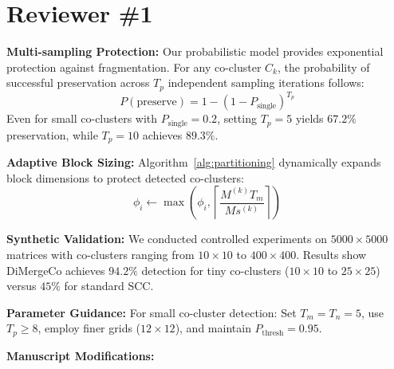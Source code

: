 \documentclass{ar2rc}
\begin{document}

\section{Reviewer \#1}



\textbf{Multi-sampling Protection:} Our probabilistic model provides exponential protection against fragmentation. For any co-cluster $C_k$, the probability of successful preservation across $T_p$ independent sampling iterations follows:
\begin{equation}
P(\text{preserve}) = 1 - \left(1 - P_{\text{single}}\right)^{T_p}
\end{equation}
Even for small co-clusters with $P_{\text{single}} = 0.2$, setting $T_p = 5$ yields $67.2\%$ preservation, while $T_p = 10$ achieves $89.3\%$.

\textbf{Adaptive Block Sizing:} Algorithm~\ref{alg:partitioning} dynamically expands block dimensions to protect detected co-clusters:
\begin{equation}
\phi_i \leftarrow \max\left(\phi_i, \left\lceil\frac{M^{(k)}T_m}{Ms^{(k)}}\right\rceil\right)
\end{equation}

\textbf{Synthetic Validation:} We conducted controlled experiments on $5000 \times 5000$ matrices with co-clusters ranging from $10 \times 10$ to $400 \times 400$. Results show DiMergeCo achieves $94.2\%$ detection for tiny co-clusters ($10 \times 10$ to $25 \times 25$) versus $45\%$ for standard SCC.

\textbf{Parameter Guidance:} For small co-cluster detection: Set $T_m = T_n = 5$, use $T_p \geq 8$, employ finer grids ($12 \times 12$), and maintain $P_{\text{thresh}} = 0.95$.


\textbf{Manuscript Modifications:}
\end{document}

